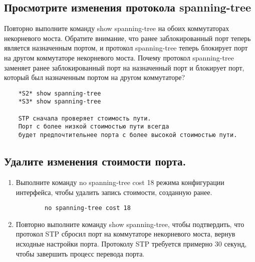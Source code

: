 \subsection{Просмотрите изменения протокола spanning-tree}
Повторно выполните команду show spanning-tree на обоих коммутаторах некорневого моста.
Обратите внимание, что ранее заблокированный порт теперь является назначенным портом, и
протокол spanning-tree теперь блокирует порт на другом коммутаторе некорневого моста.
Почему протокол spanning-tree заменяет ранее заблокированный порт на назначенный порт
и блокирует порт, который был назначенным портом на другом коммутаторе?
\begin{verbatim}
    *S2* show spanning-tree
    *S3* show spanning-tree

    STP сначала проверяет стоимость пути.
    Порт с более низкой стоимостью пути всегда
    будет предпочтительнее порта с более высокой стоимостью пути.
\end{verbatim}


\subsection{Удалите изменения стоимости порта.}
\begin{enumerate}[a]
    \item Выполните команду no spanning-tree cost 18 режима конфигурации интерфейса, чтобы удалить
    запись стоимости, созданную ранее.
    \begin{verbatim}
        no spanning-tree cost 18
    \end{verbatim}

    \item Повторно выполните команду show spanning-tree, чтобы подтвердить, что протокол STP сбросил
    порт на коммутаторе некорневого моста, вернув исходные настройки порта.
    Протоколу STP требуется примерно 30 секунд, чтобы завершить процесс перевода порта.
\end{enumerate}

